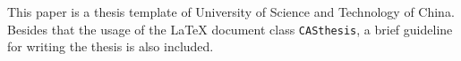 ﻿
\begin{abstract}
本文是中国科学技术大学学位论文的~\LaTeX{}~模板。除了介绍~\LaTeX{}~文档类
~\texttt{CASthesis}~的用法外，本文还是一个简要的学位论文写作指南。

\end{abstract}


\begin{englishabstract}

This paper is a thesis template of University of Science and Technology of China. Besides that
the usage of the \LaTeX{} document class \texttt{CASthesis}, a brief
guideline for writing the thesis is also included.


\end{englishabstract}

